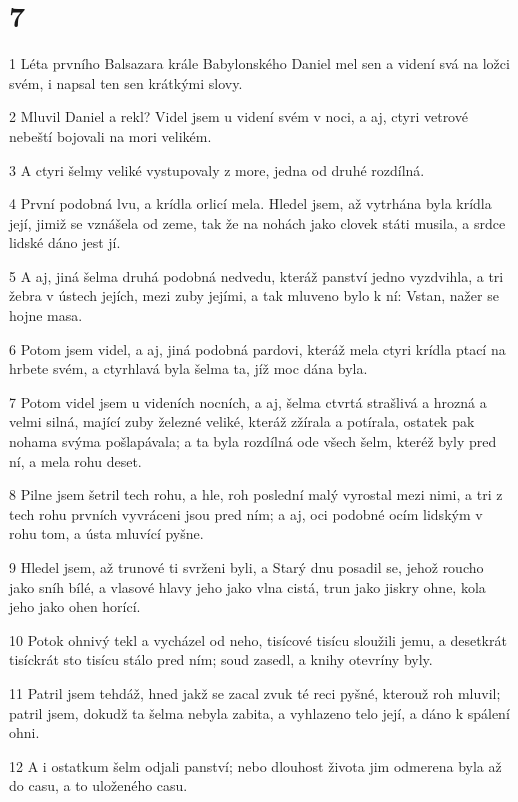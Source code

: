 \chapter{7}

\par 1 Léta prvního Balsazara krále Babylonského Daniel mel sen a videní svá na ložci svém, i napsal ten sen krátkými slovy.
\par 2 Mluvil Daniel a rekl? Videl jsem u videní svém v noci, a aj, ctyri vetrové nebeští bojovali na mori velikém.
\par 3 A ctyri šelmy veliké vystupovaly z more, jedna od druhé rozdílná.
\par 4 První podobná lvu, a krídla orlicí mela. Hledel jsem, až vytrhána byla krídla její, jimiž se vznášela od zeme, tak že na nohách jako clovek státi musila, a srdce lidské dáno jest jí.
\par 5 A aj, jiná šelma druhá podobná nedvedu, kteráž panství jedno vyzdvihla, a tri žebra v ústech jejích, mezi zuby jejími, a tak mluveno bylo k ní: Vstan, nažer se hojne masa.
\par 6 Potom jsem videl, a aj, jiná podobná pardovi, kteráž mela ctyri krídla ptací na hrbete svém, a ctyrhlavá byla šelma ta, jíž moc dána byla.
\par 7 Potom videl jsem u videních nocních, a aj, šelma ctvrtá strašlivá a hrozná a velmi silná, mající zuby železné veliké, kteráž zžírala a potírala, ostatek pak nohama svýma pošlapávala; a ta byla rozdílná ode všech šelm, kteréž byly pred ní, a mela rohu deset.
\par 8 Pilne jsem šetril tech rohu, a hle, roh poslední malý vyrostal mezi nimi, a tri z tech rohu prvních vyvráceni jsou pred ním; a aj, oci podobné ocím lidským v rohu tom, a ústa mluvící pyšne.
\par 9 Hledel jsem, až trunové ti svrženi byli, a Starý dnu posadil se, jehož roucho jako sníh bílé, a vlasové hlavy jeho jako vlna cistá, trun jako jiskry ohne, kola jeho jako ohen horící.
\par 10 Potok ohnivý tekl a vycházel od neho, tisícové tisícu sloužili jemu, a desetkrát tisíckrát sto tisícu stálo pred ním; soud zasedl, a knihy otevríny byly.
\par 11 Patril jsem tehdáž, hned jakž se zacal zvuk té reci pyšné, kterouž roh mluvil; patril jsem, dokudž ta šelma nebyla zabita, a vyhlazeno telo její, a dáno k spálení ohni.
\par 12 A i ostatkum šelm odjali panství; nebo dlouhost života jim odmerena byla až do casu, a to uloženého casu.
